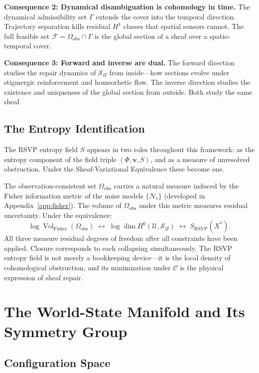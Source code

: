 \documentclass[11pt, oneside]{article}
\DeclareMathOperator{\vol}{Vol}
\begin{document}
\textbf{Consequence 2: Dynamical disambiguation is cohomology in time.} The dynamical
admissibility set $\Gamma$ extends the cover into the temporal direction. Trajectory
separation kills residual $H^1$ classes that spatial sensors cannot. The full feasible set
$\mathcal{F} = \Omega_{\mathrm{obs}} \cap \Gamma$ is the global section of a sheaf over a
spatio-temporal cover.

\textbf{Consequence 3: Forward and inverse are dual.} The forward direction studies the
repair dynamics of $\mathcal{S}_\Pi$ from inside---how sections evolve under stigmergic
reinforcement and homeorhetic flow. The inverse direction studies the existence and
uniqueness of the global section from outside. Both study the same sheaf.

\subsection{The Entropy Identification}

The RSVP entropy field $S$ appears in two roles throughout this framework: as the
entropy component of the field triple $(\Phi, \mathbf{v}, S)$, and as a measure of
unresolved obstruction. Under the Sheaf-Variational Equivalence these become one.

The observation-consistent set $\Omega_{\mathrm{obs}}$ carries a natural measure induced
by the Fisher information metric of the noise models $\{\mathcal{N}_i\}$ (developed in
Appendix~\ref{app:fisher}). The volume of $\Omega_{\mathrm{obs}}$ under this metric
measures residual uncertainty. Under the equivalence:
\[
\log \vol_{\mathrm{Fisher}}(\Omega_{\mathrm{obs}})
\;\longleftrightarrow\;
\log \dim H^0(\mathcal{U}, \mathcal{S}_\Pi)
\;\longleftrightarrow\;
S_{\mathrm{RSVP}}(X^*).
\]
All three measure residual degrees of freedom after all constraints have been applied.
Closure corresponds to each collapsing simultaneously. The RSVP entropy field is not
merely a bookkeeping device---it is the local density of cohomological obstruction, and
its minimization under $\mathcal{C}$ is the physical expression of sheaf repair.

\section{The World-State Manifold and Its Symmetry Group}
\label{sec:worldstate}

\subsection{Configuration Space}
\end{document}
